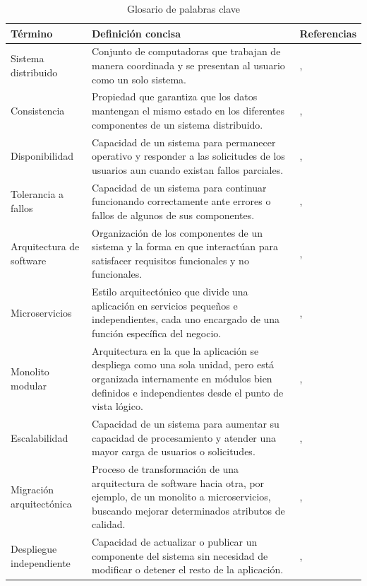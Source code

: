 \documentclass[10pt,conference]{IEEEtran}
\begin{document}
\begin{table}[!t]
\renewcommand{\arraystretch}{3.3}
\caption{Glosario de palabras clave}
\label{tab:glosario}
\centering
\begin{tabular}{|p{3.5cm}|p{12.5cm}|p{1.5cm}|}
\hline
\textbf{Término} & \textbf{Definición concisa} & \textbf{Referencias} \\
\hline
Sistema distribuido & Conjunto de computadoras que trabajan de manera coordinada y se presentan al usuario como un solo sistema. & \cite{ref1}, \cite{ref2} \\
\hline
Consistencia & Propiedad que garantiza que los datos mantengan el mismo estado en los diferentes componentes de un sistema distribuido. & \cite{ref3}, \cite{ref6} \\
\hline
Disponibilidad & Capacidad de un sistema para permanecer operativo y responder a las solicitudes de los usuarios aun cuando existan fallos parciales. & \cite{ref1}, \cite{ref5} \\
\hline
Tolerancia a fallos & Capacidad de un sistema para continuar funcionando correctamente ante errores o fallos de algunos de sus componentes. & \cite{ref2}, \cite{ref8} \\
\hline
Arquitectura de software & Organización de los componentes de un sistema y la forma en que interactúan para satisfacer requisitos funcionales y no funcionales. & \cite{ref9}, \cite{ref18} \\
\hline
Microservicios & Estilo arquitectónico que divide una aplicación en servicios pequeños e independientes, cada uno encargado de una función específica del negocio. & \cite{ref9}, \cite{ref16} \\
\hline
Monolito modular & Arquitectura en la que la aplicación se despliega como una sola unidad, pero está organizada internamente en módulos bien definidos e independientes desde el punto de vista lógico. & \cite{ref18}, \cite{ref19} \\
\hline
Escalabilidad & Capacidad de un sistema para aumentar su capacidad de procesamiento y atender una mayor carga de usuarios o solicitudes. & \cite{ref9}, \cite{ref20} \\
\hline
Migración arquitectónica & Proceso de transformación de una arquitectura de software hacia otra, por ejemplo, de un monolito a microservicios, buscando mejorar determinados atributos de calidad. & \cite{ref17}, \cite{ref20} \\
\hline
Despliegue independiente & Capacidad de actualizar o publicar un componente del sistema sin necesidad de modificar o detener el resto de la aplicación. & \cite{ref10}, \cite{ref13} \\

\end{tabular}
\end{table}
\end{document}
